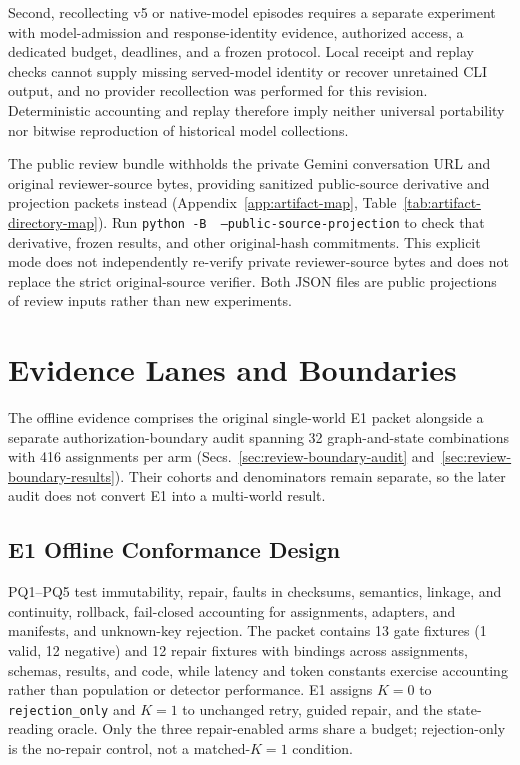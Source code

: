 \documentclass[journal]{IEEEtran}
\begin{document}
Second, recollecting v5 or native-model episodes requires a separate experiment with model-admission and response-identity evidence, authorized access, a dedicated budget, deadlines, and a frozen protocol. Local receipt and replay checks cannot supply missing served-model identity or recover unretained CLI output, and no provider recollection was performed for this revision. Deterministic accounting and replay therefore imply neither universal portability nor bitwise reproduction of historical model collections.

The public review bundle withholds the private Gemini conversation URL and original reviewer-source bytes, providing sanitized public-source derivative and projection packets instead (Appendix~\ref{app:artifact-map}, Table~\ref{tab:artifact-directory-map}). Run \texttt{python -B }\allowbreak\ \texttt{--public-source-projection} to check that derivative, frozen results, and other original-hash commitments. This explicit mode does not independently re-verify private reviewer-source bytes and does not replace the strict original-source verifier. Both JSON files are public projections of review inputs rather than new experiments.

\section{Evidence Lanes and Boundaries}\label{sec:lanes}
The offline evidence comprises the original single-world E1 packet alongside a separate authorization-boundary audit spanning 32 graph-and-state combinations with 416 assignments per arm (Secs.~\ref{sec:review-boundary-audit} and~\ref{sec:review-boundary-results}). Their cohorts and denominators remain separate, so the later audit does not convert E1 into a multi-world result.

\subsection{\textbf{E1} Offline Conformance Design}
PQ1--PQ5 test immutability, repair, faults in checksums, semantics, linkage, and continuity, rollback, fail-closed accounting for assignments, adapters, and manifests, and unknown-key rejection. The packet contains 13 gate fixtures (1 valid, 12 negative) and 12 repair fixtures with bindings across assignments, schemas, results, and code, while latency and token constants exercise accounting rather than population or detector performance.
E1 assigns $K{=}0$ to \texttt{rejection\_only} and $K{=}1$ to unchanged retry, guided repair, and the state-reading oracle. Only the three repair-enabled arms share a budget; rejection-only is the no-repair control, not a matched-$K{=}1$ condition.
\end{document}
